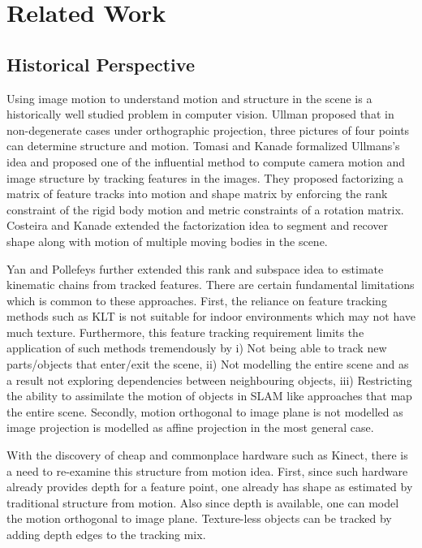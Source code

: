 \documentclass[conference]{IEEEtran}
\begin{document}
\section{Related Work}

\subsection{Historical Perspective}
Using image motion to understand motion and structure in the scene is a historically well studied problem in computer vision.  Ullman \cite{ullman1979interpretation} proposed that in non-degenerate cases under orthographic projection, three pictures of four points can determine structure and motion. Tomasi and Kanade \cite{tomasi1992shape} formalized Ullmans's idea and proposed one of the influential method to compute camera motion and image structure by tracking features in the images. They proposed factorizing a matrix of feature tracks into motion and shape matrix by enforcing the rank constraint of the rigid body motion and metric constraints of a rotation matrix. Costeira and Kanade \cite{costeira1998multibody} extended the factorization idea to segment and recover shape along with motion of multiple moving bodies in the scene. 

Yan and Pollefeys \cite{yan2006automatic} further extended this rank and subspace idea to estimate kinematic chains from tracked features. There are certain fundamental limitations which is common to these approaches. First, the reliance on feature tracking methods such as KLT is not suitable for indoor environments which may not have much texture. Furthermore, this feature tracking requirement limits the application of such methods tremendously by i) Not being able to track new parts/objects that enter/exit the scene, ii) Not modelling the entire scene and as a result not exploring dependencies between neighbouring objects, iii) Restricting the ability to assimilate the motion of objects in SLAM like approaches that map the entire scene. Secondly, motion orthogonal to image plane is not modelled \cite{yan2006automatic} as image projection is modelled as affine projection in the most general case. 

With the discovery of cheap and commonplace hardware such as Kinect, there is a need to re-examine this structure from motion idea. First, since such hardware already provides depth for a feature point, one already has shape as estimated by traditional structure from motion. Also since depth is available, one can model the motion orthogonal to image plane. Texture-less objects can be tracked by adding depth edges to the tracking mix.
\end{document}
